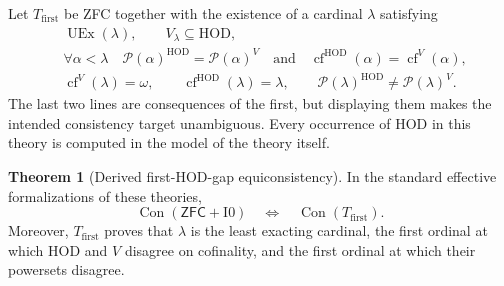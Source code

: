 \documentclass[11pt,letterpaper]{article}
\theoremstyle{definition}
\newtheorem{theorem}[definition]{Theorem}
\newcommand{\ZFC}{\mathsf{ZFC}}
\newcommand{\HOD}{\mathrm{HOD}}
\newcommand{\UEx}{\operatorname{UEx}}
\newcommand{\Con}{\operatorname{Con}}
\newcommand{\cf}{\operatorname{cf}}
\newcommand{\Izero}{\mathrm{I0}}
\newcommand{\Pow}{\mathcal{P}}
\theoremstyle{remark}
\begin{document}
Let $T_{\mathrm{first}}$ be ZFC together with the existence of a cardinal $\lambda$ satisfying
\begin{align}
 &\UEx(\lambda),\qquad V_\lambda\subseteq\HOD,\label{eq:first-base}\\
 &\forall\alpha<\lambda\quad
       \Pow(\alpha)^\HOD=\Pow(\alpha)^V
       \quad\text{and}\quad
       \cf^\HOD(\alpha)=\cf^V(\alpha),\label{eq:first-below}\\
 &\cf^V(\lambda)=\omega,
       \qquad \cf^\HOD(\lambda)=\lambda,
       \qquad \Pow(\lambda)^\HOD\neq\Pow(\lambda)^V.
       \label{eq:first-at}
\end{align}
The last two lines are consequences of the first, but displaying them makes the intended consistency target unambiguous. Every occurrence of HOD in this theory is computed in the model of the theory itself.

\begin{theorem}[Derived first-HOD-gap equiconsistency]\label{thm:equiconsistency}
In the standard effective formalizations of these theories,
\begin{equation}
 \Con(\ZFC+\Izero)
 \quad\Longleftrightarrow\quad
 \Con(T_{\mathrm{first}}).\label{eq:equiconsistency}
\end{equation}
Moreover, $T_{\mathrm{first}}$ proves that $\lambda$ is the least exacting cardinal, the first ordinal at which HOD and $V$ disagree on cofinality, and the first ordinal at which their powersets disagree.
\end{theorem}
\end{document}
